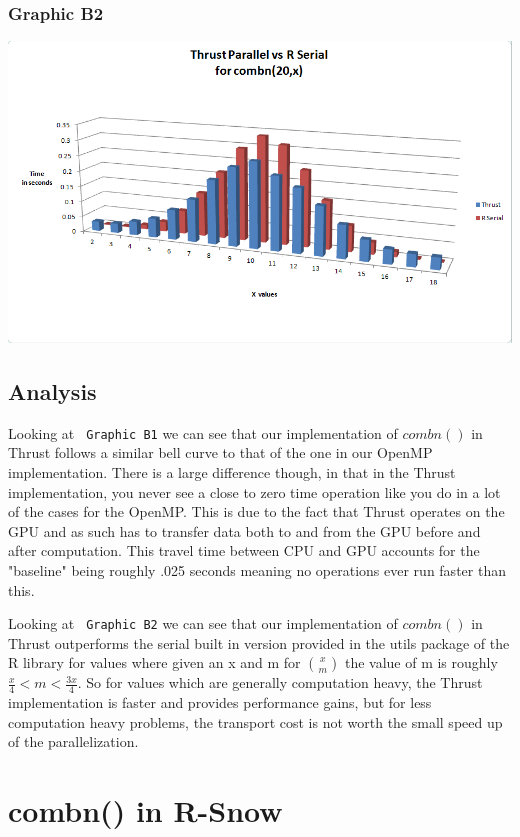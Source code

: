 \documentclass[titlepage, 11pt]{article}
\begin{document}
\subsubsection{Graphic B2}
\includegraphics[scale = 0.5]{images/ThrustvsR.png}

\subsection{Analysis}
Looking at \verb; Graphic B1; we can see that our implementation of $combn()$ in Thrust follows a similar bell curve to that of the one in our OpenMP implementation. There is a large difference though, in that in the Thrust implementation, you never see a close to zero time operation like you do in a lot of the cases for the OpenMP. This is due to the fact that Thrust operates on the GPU and as such has to transfer data both to and from the GPU before and after computation. This travel time between CPU and GPU accounts for the "baseline" being roughly .025 seconds meaning no operations ever run faster than this.

Looking at \verb; Graphic B2; we can see that our implementation of $combn()$ in Thrust outperforms the serial built in version provided in the utils package of the R library for values where given an x and m for ${x \choose m}$ the value of m is roughly $\frac{x}{4} < m < \frac{3x}{4}$. So for values which are generally computation heavy, the Thrust implementation is faster and provides performance gains, but for less computation heavy problems, the transport cost is not worth the small speed up of the parallelization.

\section{combn() in R-Snow}
\end{document}
